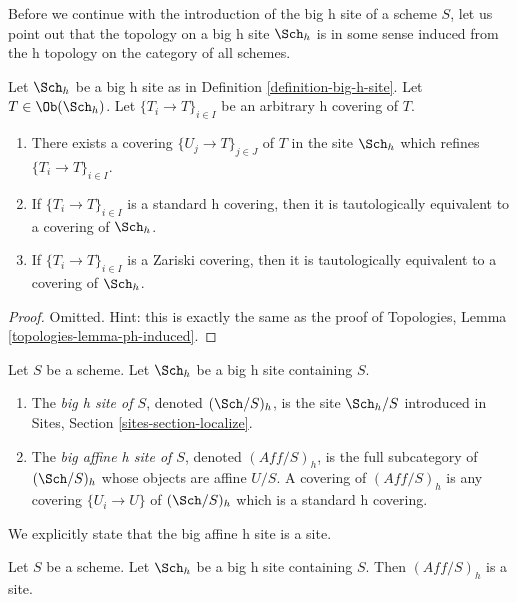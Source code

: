 \medskip\noindent
Before we continue with the introduction of the big h site of
a scheme $S$, let us point out that the topology on a big h site
$\Sch_h$ is in some sense induced from the h topology
on the category of all schemes.

\begin{lemma}
\label{lemma-h-induced}
Let $\Sch_h$ be a big h site as in
Definition \ref{definition-big-h-site}.
Let $T \in \Ob(\Sch_h)$.
Let $\{T_i \to T\}_{i \in I}$ be an arbitrary h covering of $T$.
\begin{enumerate}
\item There exists a covering $\{U_j \to T\}_{j \in J}$ of $T$ in the site
$\Sch_h$ which refines $\{T_i \to T\}_{i \in I}$.
\item If $\{T_i \to T\}_{i \in I}$ is a standard h covering, then
it is tautologically equivalent to a covering of $\Sch_h$.
\item If $\{T_i \to T\}_{i \in I}$ is a Zariski covering, then
it is tautologically equivalent to a covering of $\Sch_h$.
\end{enumerate}
\end{lemma}

\begin{proof}
Omitted. Hint: this is exactly the same as the proof of
Topologies, Lemma \ref{topologies-lemma-ph-induced}.
\end{proof}

\begin{definition}
\label{definition-big-small-h}
Let $S$ be a scheme. Let $\Sch_h$ be a big h site containing $S$.
\begin{enumerate}
\item The {\it big h site of $S$}, denoted
$(\Sch/S)_h$, is the site $\Sch_h/S$
introduced in Sites, Section \ref{sites-section-localize}.
\item The {\it big affine h site of $S$}, denoted
$(\textit{Aff}/S)_h$, is the full subcategory of
$(\Sch/S)_h$ whose objects are affine $U/S$.
A covering of $(\textit{Aff}/S)_h$ is any covering
$\{U_i \to U\}$ of $(\Sch/S)_h$ which is a standard h covering.
\end{enumerate}
\end{definition}

\noindent
We explicitly state that the big affine h site is a site.

\begin{lemma}
\label{lemma-verify-site-h}
Let $S$ be a scheme. Let $\Sch_h$ be a big h
site containing $S$. Then $(\textit{Aff}/S)_h$ is a site.
\end{lemma}


